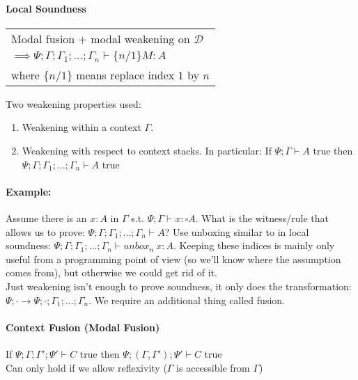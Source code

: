 \documentclass[12 pt]{article}
\begin{document}
      \paragraph{Local Soundness}
      \begin{center}
        \noLine
        \DP
        \begin{tabular}{l}
          Modal fusion + modal weakening on $\mathcal{D}$
          \\ $\implies \Psi; \Gamma; \Gamma_1; \ldots; \Gamma_n \vdash \{n/1\} M : A$
          \\ where $\{n/1\}$ means replace index $1$ by $n$
        \end{tabular}
      \end{center}
      Two weakening properties used:
      \begin{enumerate}
      \item Weakening within a context $\Gamma$.
      \item Weakening with respect to context stacks. In particular:
        If $\Psi; \Gamma \vdash A$ true then $\Psi; \Gamma; \Gamma_1;
        \ldots; \Gamma_n \vdash A$ true
      \end{enumerate}
      \paragraph{Example:} Assume there is an $x : A$ in $\Gamma$
      s.t. $\Psi ; \Gamma \vdash x : \square A$. What is the witness/rule that
      allows us to prove: $\Psi ; \Gamma; \Gamma_1 ; \ldots ; \Gamma_n
      \vdash A$? Use unboxing similar to in local soundness:
      $\Psi ; \Gamma; \Gamma_1 ; \ldots ; \Gamma_n
      \vdash unbox_n\ x : A$. Keeping these indices is mainly only
      useful from a programming point of view (so we'll know where the
      assumption comes from), but otherwise we could get rid of it.
      \\ Just weakening isn't enough to prove soundness, it only does
      the transformation: $\Psi; \cdot \to \Psi; \cdot ; \Gamma_1 ;
      \ldots ; \Gamma_n$. We require an additional thing called fusion.
      \paragraph{Context Fusion (Modal Fusion)}
      If $\Psi; \Gamma; \Gamma' ; \Psi' \vdash C$ true then $\Psi;
      (\Gamma, \Gamma') ; \Psi' \vdash C$ true
      \\ Can only hold if we allow reflexivity ($\Gamma$ is accessible
      from $\Gamma$)
\end{document}
